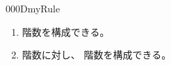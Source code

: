 \documentclass[index]{subfiles}
\begin{document}
\begin{myBlock}{000D}{myRule}
  \begin{enumerate}
  \item 階数\myInlineMath{\myLevelZero}を構成できる。
  \item 階数に対し、
    階数を構成できる。
  \end{enumerate}
\end{myBlock}
\end{document}
